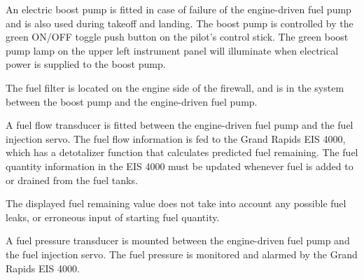 An electric boost pump is fitted in case of failure of the engine-driven fuel pump and is also used during takeoff and landing. The boost pump is controlled by the green ON/OFF toggle push button on the pilot's control stick. The green boost pump lamp on the upper left instrument panel will illuminate when electrical power is supplied to the boost pump.

The fuel filter is located on the engine side of the firewall, and is in the system between the boost pump and the engine-driven fuel pump.

A fuel flow transducer is fitted between the engine-driven fuel pump and the fuel injection servo. The fuel flow information is fed to the Grand Rapids EIS 4000, which has a detotalizer function that calculates predicted fuel remaining. The fuel quantity information in the EIS 4000 must be updated whenever fuel is added to or drained from the fuel tanks.
\begin{Note}[WARNING]The displayed fuel remaining value does not take into account any possible fuel leaks, or erroneous input of starting fuel quantity.
\end{Note}

A fuel pressure transducer is mounted between the engine-driven fuel pump and the fuel injection servo. The fuel pressure is monitored and alarmed by the Grand Rapids EIS 4000.
\clearpage

